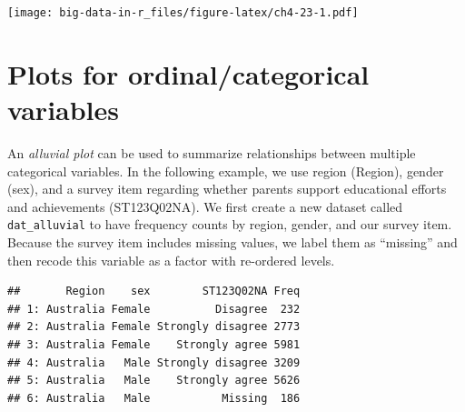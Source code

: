 \documentclass[]{book}
\newenvironment{Shaded}{\begin{snugshade}}{\end{snugshade}}
\newcommand{\DataTypeTok}[1]{\textcolor[rgb]{0.13,0.29,0.53}{#1}}
\newcommand{\ErrorTok}[1]{\textcolor[rgb]{0.64,0.00,0.00}{\textbf{#1}}}
\newcommand{\KeywordTok}[1]{\textcolor[rgb]{0.13,0.29,0.53}{\textbf{#1}}}
\newcommand{\NormalTok}[1]{#1}
\newcommand{\OperatorTok}[1]{\textcolor[rgb]{0.81,0.36,0.00}{\textbf{#1}}}
\newcommand{\StringTok}[1]{\textcolor[rgb]{0.31,0.60,0.02}{#1}}
\begin{document}
\texttt{[image: big-data-in-r\_files/figure-latex/ch4-23-1.pdf]}

\hypertarget{plots-for-ordinalcategorical-variables}{%
\section{Plots for ordinal/categorical variables}\label{plots-for-ordinalcategorical-variables}}

An \emph{alluvial plot} can be used to summarize relationships between multiple categorical variables. In the following example, we use region (Region), gender (sex), and a survey item regarding whether parents support educational efforts and achievements (ST123Q02NA). We first create a new dataset called \texttt{dat\_alluvial} to have frequency counts by region, gender, and our survey item. Because the survey item includes missing values, we label them as ``missing'' and then recode this variable as a factor with re-ordered levels.

\begin{Shaded}
\end{Shaded}

\begin{verbatim}
##       Region    sex        ST123Q02NA Freq
## 1: Australia Female          Disagree  232
## 2: Australia Female Strongly disagree 2773
## 3: Australia Female    Strongly agree 5981
## 4: Australia   Male Strongly disagree 3209
## 5: Australia   Male    Strongly agree 5626
## 6: Australia   Male           Missing  186
\end{verbatim}
\end{document}
